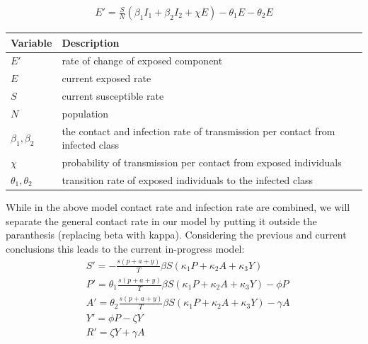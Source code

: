 \documentclass{article}
\begin{document}
\begin{align*}
  E' = \frac{S}{N} (\beta _1 I_1 + \beta _2 I_2 + \chi E) - \theta _1 E - \theta _2 E
\end{align*}

\begin{tabular}{|l | l |}
  \hline
  Variable                 & Description                                                                    \\ [0.5ex]
  \hline\hline
  $E'$                     & rate of change of exposed component                                            \\
  \hline
  $E$                      & current exposed rate                                                           \\
  \hline
  $S$                      & current susceptible rate                                                       \\
  \hline
  $N$                      & population                                                                     \\
  \hline
  $\beta _1 , \beta _2 $   & the contact and infection rate of transmission per contact from infected class \\
  \hline
  $\chi$                   & probability of transmission per contact from exposed individuals               \\
  \hline
  $\theta _1 , \theta _2 $ & transition rate of exposed individuals to the infected class                   \\
  \hline
\end{tabular}
\cite{dynamic}

While in the above model contact rate and infection rate are combined, we will separate the general contact rate in our model by putting it outside the paranthesis (replacing beta with kappa). Considering the previous and current conclusions this leads to the current in-progress model:
\begin{align*}
  & S' = - \frac{s(p+a+y)}{T} \beta S (\kappa _1 P + \kappa _2 A + \kappa _3 Y)                     \\
  & P' = \theta _ 1 \frac{s(p+a+y)}{T} \beta S (\kappa _1 P + \kappa _2 A + \kappa _3 Y) - \phi P   \\
  & A' = \theta _ 2 \frac{s(p+a+y)}{T} \beta S (\kappa _1 P + \kappa _2 A + \kappa _3 Y) - \gamma A \\
  & Y' = \phi P - \zeta Y                                                                           \\
  & R' = \zeta Y + \gamma A
\end{align*}
\end{document}
